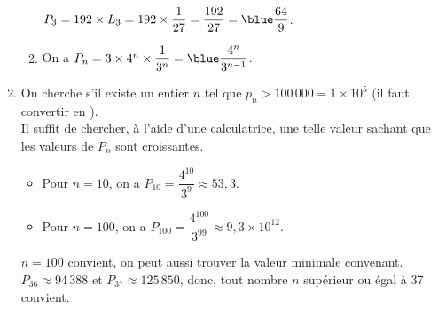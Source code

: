 \begin{enumerate}
\begin{enumerate}
               $P_3 =192\times L_3 =192\times\dfrac{1}{27} =\dfrac{192}{27} ={\blue \dfrac{64}{9}}$. \\ [1mm]
            \item On a $P_n =3\times4^n\times\dfrac{1}{3^n} ={\blue \dfrac{4^n}{3^{n-1}}}$. \smallskip
         \end{enumerate}
      \setcounter{enumi}{3}
      \item On cherche s'il existe un entier $n$ tel que $p_n>100\,000 =1\times10^5$ (il faut convertir  en \ucm{}). \\
         Il suffit de chercher, à l'aide d'une calculatrice, une telle valeur sachant que les valeurs de $P_n$ sont croissantes.
         \begin{itemize}
            \item Pour $n =10$, on a $P_{10} =\dfrac{4^{10}}{3^9} \approx53,3$. \smallskip
            \item Pour $n =100$, on a $P_{100} =\dfrac{4^{100}}{3^{99}} \approx9,3\times10^{12}$. \smallskip
         \end{itemize}
         $n =100$ convient, on peut aussi trouver la valeur minimale convenant. \\
         $P_{36} \approx94\,388$ et $P_{37} \approx 125\,850$, donc, {\blue tout nombre $n$ supérieur ou égal à 37 convient}.
   \end{enumerate}

